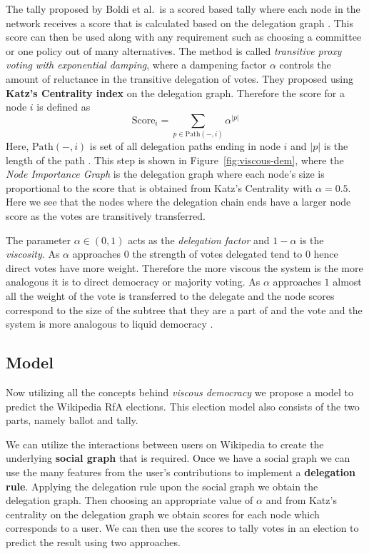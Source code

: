 The tally proposed by Boldi et al.\ is a scored based tally where each node in the network receives a score that is calculated based on the delegation graph \cite{ViscousDemocracy}. This score can then be used along with any requirement such as choosing a committee or one policy out of many alternatives. The method is called \textit{transitive proxy voting with exponential damping}, where a dampening factor $\alpha$ controls the amount of reluctance in the transitive delegation of votes. They proposed using \textbf{Katz's Centrality index} on the delegation graph. Therefore the score for a node $i$ is defined as 
\[\text{Score}_{i}  = \sum_{p \in \text{Path}(-,i)} \alpha^{|p|}\]
Here, $\text{Path}(-,i)$ is set of all delegation paths ending in node $i$ and $|p|$ is the length of the path \cite{ViscousDemocracy}. This step is shown in Figure~\ref{fig:viscous-dem}, where the \textit{Node Importance Graph} is the delegation graph where each node's size is proportional to the score that is obtained from Katz's Centrality with $\alpha=0.5$. Here we see that the nodes where the delegation chain ends have a larger node score as the votes are transitively transferred.

The parameter $\alpha\in (0,1)$ acts as the \textit{delegation factor} and $1-\alpha$ is the \textit{viscosity}. As $\alpha$ approaches $0$ the strength of votes delegated tend to $0$ hence direct votes have more weight. Therefore the more viscous the system is the more analogous it is to direct democracy or majority voting. As $\alpha$ approaches $1$ almost all the weight of the vote is transferred to the delegate and the node scores correspond to the size of the subtree that they are a part of and the vote and the system is more analogous to liquid democracy \cite{ViscousDemocracy}.

\subsection{Model} 
Now utilizing all the concepts behind \textit{viscous democracy} we propose a model to predict the Wikipedia RfA elections. This election model also consists of the two parts, namely ballot and tally. 

We can utilize the interactions between users on Wikipedia to create the underlying \textbf{social graph} that is required. Once we have a social graph we can use the many features from the user's contributions to implement a \textbf{delegation rule}. Applying the delegation rule upon the social graph we obtain the delegation graph. Then choosing an appropriate value of $\alpha$ and from Katz's centrality on the delegation graph we obtain scores for each node which corresponds to a user. We can then use the scores to tally votes in an election to predict the result using two approaches.

